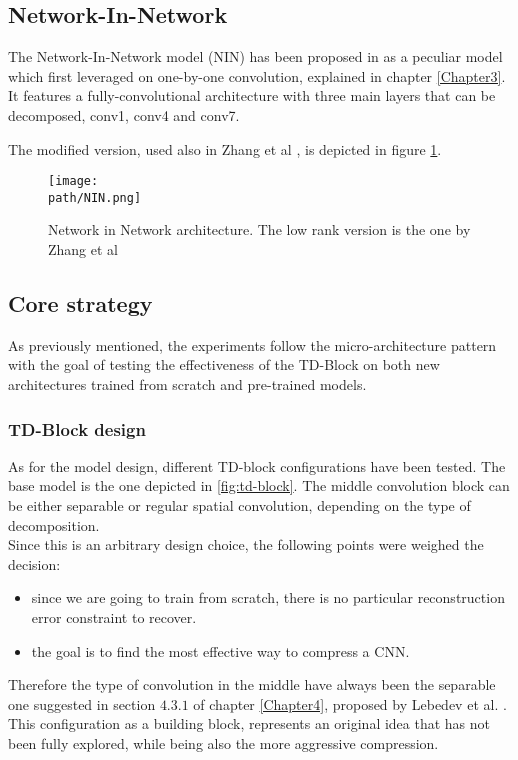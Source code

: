 \subsection{Network-In-Network}
The Network-In-Network model (NIN) has been proposed in \citep{NIN} as a peculiar model which first leveraged on one-by-one convolution, explained in chapter \ref{Chapter3}. It features a fully-convolutional architecture with three main layers that can be decomposed, conv1, conv4 and conv7. 

The modified version, used also in Zhang et al \parencite{zhang2015SVD}, is depicted in figure \ref{fig:NIN}.
\begin{figure}[h!]
 \centering
 \texttt{[image: \\path/NIN.png]} 
 \caption{Network in Network architecture. The low rank version is the one by Zhang et al\parencite{zhang2015SVD} }
 \label{fig:NIN}
\end{figure}

\subsection{Core strategy}
As previously mentioned, the experiments follow the micro-architecture pattern with the goal of testing the effectiveness of the TD-Block on both new architectures trained from scratch and pre-trained models. 

\subsubsection{TD-Block design}
As for the model design, different TD-block configurations have been tested. The base model is the one depicted in \ref{fig:td-block}. The middle convolution block can be either separable or regular spatial convolution, depending on the type of decomposition. \\
Since this is an arbitrary design choice, the following points were weighed the decision: 

\begin{itemize}
    \item since we are going to train from scratch, there is no particular reconstruction error constraint to recover.
    
    \item the goal is to find the most effective way to compress a CNN.
\end{itemize}

Therefore the type of convolution in the middle have always been the separable one suggested in section $4.3.1$ of chapter \ref{Chapter4}, proposed by Lebedev et al. \parencite{lebedev}. This configuration as a building block, represents an original idea that has not been fully explored, while being also the more aggressive compression. 

